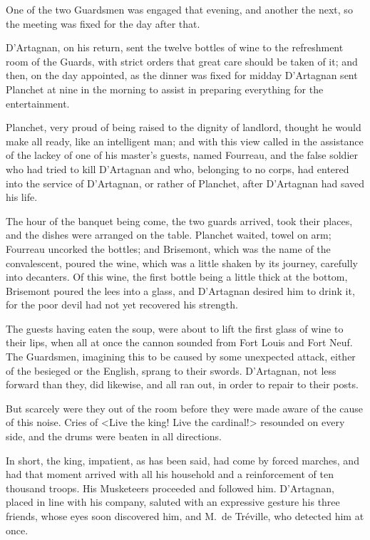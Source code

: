 One of the two Guardsmen was engaged that evening, and another the next, so the meeting was fixed for the day after that. 

D'Artagnan, on his return, sent the twelve bottles of wine to the refreshment room of the Guards, with strict orders that great care should be taken of it; and then, on the day appointed, as the dinner was fixed for midday D'Artagnan sent Planchet at nine in the morning to assist in preparing everything for the entertainment. 

Planchet, very proud of being raised to the dignity of landlord, thought he would make all ready, like an intelligent man; and with this view called in the assistance of the lackey of one of his master's guests, named Fourreau, and the false soldier who had tried to kill D'Artagnan and who, belonging to no corps, had entered into the service of D'Artagnan, or rather of Planchet, after D'Artagnan had saved his life. 

The hour of the banquet being come, the two guards arrived, took their places, and the dishes were arranged on the table. Planchet waited, towel on arm; Fourreau uncorked the bottles; and Brisemont, which was the name of the convalescent, poured the wine, which was a little shaken by its journey, carefully into decanters. Of this wine, the first bottle being a little thick at the bottom, Brisemont poured the lees into a glass, and D'Artagnan desired him to drink it, for the poor devil had not yet recovered his strength. 

The guests having eaten the soup, were about to lift the first glass of wine to their lips, when all at once the cannon sounded from Fort Louis and Fort Neuf. The Guardsmen, imagining this to be caused by some unexpected attack, either of the besieged or the English, sprang to their swords. D'Artagnan, not less forward than they, did likewise, and all ran out, in order to repair to their posts. 

But scarcely were they out of the room before they were made aware of the cause of this noise. Cries of <Live the king! Live the cardinal!> resounded on every side, and the drums were beaten in all directions. 

In short, the king, impatient, as has been said, had come by forced marches, and had that moment arrived with all his household and a reinforcement of ten thousand troops. His Musketeers proceeded and followed him. D'Artagnan, placed in line with his company, saluted with an expressive gesture his three friends, whose eyes soon discovered him, and M.~de Tréville, who detected him at once. 

